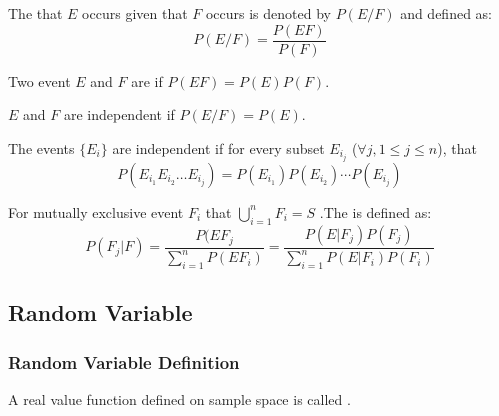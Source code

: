 \begin{definition}
    The  that $E$ occurs given that $F$ occurs is denoted by $P(E/F)$ and defined as:
    \begin{equation}
        P(E/F) = \frac{P(EF)}{P(F)}
    \end{equation}
\end{definition}

\begin{definition}[independent]
    Two event $E$ and $F$ are  if $P(EF) = P(E) P(F)$.
\end{definition}

\begin{theorem}
    $E$ and $F$ are independent if $P(E/F) = P(E)$.    
\end{theorem}

\begin{definition}
    The events $\{ E_i \}$ are independent if for every subset $E_{i_j}$ ($ \forall j, 1 \leq j \leq n$), that
    \begin{equation}
        P(E_{i_1} E_{i_2} \dots E_{i_j}) = P(E_{i_1}) P(E_{i_2}) \cdots P(E_{i_j})
    \end{equation}
\end{definition}

\begin{definition}
    For mutually exclusive event $F_i$ that $\displaystyle \bigcup_{i=1}^n F_i = S$ .The  is defined as:
    \begin{equation}
        P(F_j | F) = \frac{P(EF_j}{\sum\limits_{i=1}^n P(EF_i)} = \frac{P(E|F_j) P(F_j)}{\sum\limits_{i=1}^n P(E|F_i) P(F_i)}
    \end{equation}
\end{definition}



\subsection{Random Variable}

\subsubsection{Random Variable Definition}

\begin{definition}
    A real value function defined on sample space is called .
\end{definition}

